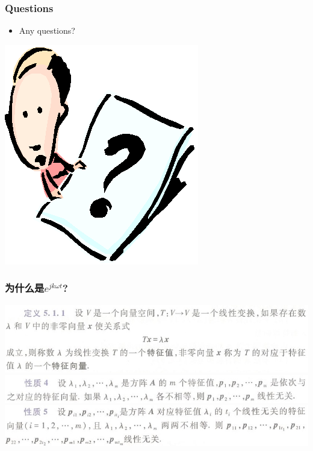 \documentclass[CJKutf8,xcolor=pdftex,dvipsnames,table]{beamer}
\begin{document}
\begin{CJK*}{UTF8}{song}
  \begin{frame}
    \frametitle{Questions}
    \begin{itemize}
    \item Any questions?
    \end{itemize}
    \begin{center}
      \includegraphics[scale=.5]{question}
    \end{center}
  \end{frame} 
  
  \begin{frame}
    \frametitle{为什么是$e^{jk\omega t}$?}
    \begin{center}
      \includegraphics[scale=.4]{cqu-la-def-5-1-1}
      \includegraphics[scale=.4]{cqu-la-def-5-1-1-4}
      \includegraphics[scale=.4]{cqu-la-def-5-1-1-5}
    \end{center}
  \end{frame}   
  

\end{CJK*}
\end{document}
